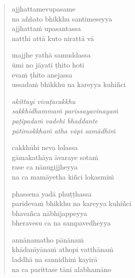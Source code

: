 \clearpage
\begin{verse}

ajjhattamevupasame\\
na aññato bhikkhu santimeseyya\\
ajjhattaṁ upasantassa\\
natthi attā kuto nirattā vā

majjhe yathā samuddassa\\
ūmi no jāyatī ṭhito hoti\\
evaṁ ṭhito anejassa\\
ussadaṁ bhikkhu na kareyya kuhiñci

\emph{akittayī vivaṭacakkhu\\
sakkhidhammaṁ parissayavinayaṁ}\\
\emph{paṭipadaṁ vadehi bhaddante\\
pātimokkhaṁ atha vāpi samādhiṁ}

cakkhūhi neva lolassa\\
gāmakathāya āvaraye sotaṁ\\
rase ca nānugijjheyya\\
na ca mamāyetha kiñci lokasmiṁ

phassena yadā phuṭṭhassa\\
paridevaṁ bhikkhu na kareyya kuhiñci\\
bhavañca nābhijappeyya\\
bheravesu ca na sampavedheyya

annānamatho pānānaṁ\\
khādanīyānaṁ athopi vatthānaṁ\\
laddhā na sannidhiṁ kayirā\\
na ca parittase tāni alabhamāno

\end{verse}



